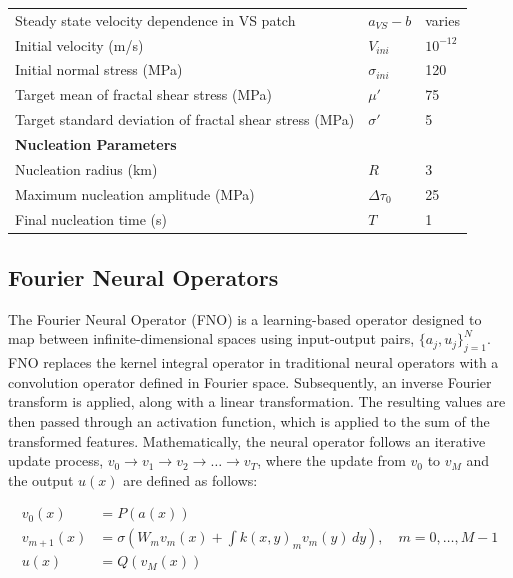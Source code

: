 \documentclass[draft]{agujournal2019}
\begin{document}
\begin{table}[ht!]
\begin{tabular}{@{}lll@{}}
Steady state velocity dependence in VS patch & $a_{VS} - b$ & varies   \\ 
Initial velocity (m/s)          & $V_{ini}$     & $10^{-12}$ \\
Initial normal stress (MPa)     & $\sigma_{ini}$ & 120 \\
Target mean of fractal shear stress (MPa) & $\mu'$ & 75 \\
Target standard deviation of fractal shear stress (MPa) & $\sigma'$ & 5 \\ \midrule
\textbf{Nucleation Parameters}  &                 &                \\ \midrule
Nucleation radius (km)             & $R$      & 3           \\
Maximum nucleation amplitude (MPa) & $\Delta\tau_{0}$        & 25            \\
Final nucleation time (s) & $T$        & 1            \\
\bottomrule
\end{tabular}
\end{table}

\subsection{Fourier Neural Operators}
\label{sec:fno}

The Fourier Neural Operator (FNO) is a learning-based operator designed to map between infinite-dimensional spaces using input-output pairs, $\{a_j, u_j\}_{j=1}^{N}$. FNO replaces the kernel integral operator in traditional neural operators with a convolution operator defined in Fourier space. Subsequently, an inverse Fourier transform is applied, along with a linear transformation. The resulting values are then passed through an activation function, which is applied to the sum of the transformed features. Mathematically, the neural operator follows an iterative update process, $v_0 \rightarrow v_1 \rightarrow v_2 \rightarrow \dots \rightarrow v_T$, where the update from $v_0$ to $v_M$ and the output $u(x)$ are defined as follows:

\begin{equation}
\label{eqn:fno}
\begin{aligned}
    v_{0}(x) &= P(a(x)) \\
    v_{m+1}(x) &= \sigma\left(W_{m} v_{m}(x) + \int k(x,y)_{m} v_{m}(y)\,dy \right), \quad m=0,\dots,M-1 \\
    u(x) &= Q(v_{M}(x))
\end{aligned}
\end{equation}
\end{document}

